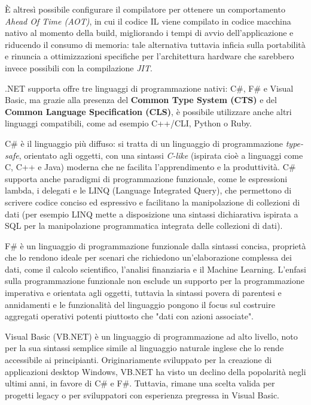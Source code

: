 È altresì possibile configurare il compilatore per ottenere un comportamento \emph{Ahead Of Time (AOT)}, in cui il codice IL viene compilato in codice macchina nativo al momento della build, migliorando i tempi di avvio dell'applicazione e riducendo il consumo di memoria: tale alternativa tuttavia inficia sulla portabilità e rinuncia a ottimizzazioni specifiche per l'architettura hardware che sarebbero invece possibili con la compilazione \emph{JIT}.

.NET supporta offre tre linguaggi di programmazione nativi: C\#, F\# e Visual Basic, ma grazie alla presenza del \textbf{Common Type System (CTS)} e del \textbf{Common Language Specification (CLS)}, è possibile utilizzare anche altri linguaggi compatibili, come ad esempio C++/CLI, Python o Ruby.

C\# è il linguaggio più diffuso: si tratta di un linguaggio di programmazione \emph{type-safe}, orientato agli oggetti, con una sintassi \emph{C-like} (ispirata cioè a linguaggi come C, C++ e Java) moderna che ne facilita l'apprendimento e la produttività.
C\# supporta anche paradigmi di programmazione funzionale, come le espressioni lambda, i delegati e le LINQ (Language Integrated Query), che permettono di scrivere codice conciso ed espressivo e facilitano la manipolazione di collezioni di dati (per esempio LINQ mette a disposizione una sintassi dichiarativa ispirata a SQL per la manipolazione programmatica integrata delle collezioni di dati).

F\# è un linguaggio di programmazione funzionale dalla sintassi concisa, proprietà che lo rendono ideale per scenari che richiedono un'elaborazione complessa dei dati, come il calcolo scientifico, l'analisi finanziaria e il Machine Learning. L'enfasi sulla programmazione funzionale non esclude un supporto per la programmazione imperativa e orientata agli oggetti, tuttavia la sintassi povera di parentesi e annidamenti e le funzionalità del linguaggio pongono il focus sul costruire aggregati operativi potenti piuttosto che "dati con azioni associate".

Visual Basic (VB.NET) è un linguaggio di programmazione ad alto livello, noto per la sua sintassi semplice simile al linguaggio naturale inglese che lo rende accessibile ai principianti. Originariamente sviluppato per la creazione di applicazioni desktop Windows, VB.NET ha visto un declino della popolarità negli ultimi anni, in favore di C\# e F\#. Tuttavia, rimane una scelta valida per progetti legacy o per sviluppatori con esperienza pregressa in Visual Basic.

